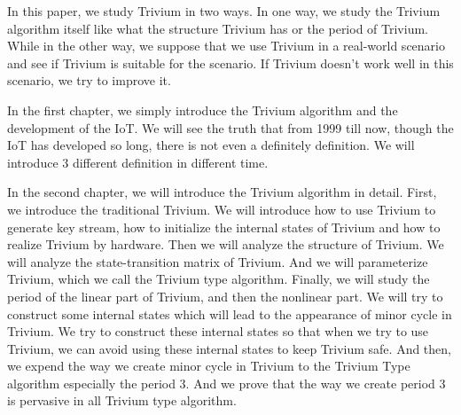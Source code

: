 \begin{bigabstract}
In this paper, we study Trivium in two ways. In one way, we study the Trivium algorithm itself like what the structure Trivium has or the period of Trivium. While in the other way, we suppose that we use Trivium in a real-world scenario and see if Trivium is suitable for the scenario. If Trivium doesn’t work well in this scenario, we try to improve it.

In the first chapter, we simply introduce the Trivium algorithm and the development of the IoT. We will see the truth that from 1999 till now, though the IoT has developed so long, there is not even a definitely definition. We will introduce 3 different definition in different time.

In the second chapter, we will introduce the Trivium algorithm in detail. First, we introduce the traditional Trivium. We will introduce how to use Trivium to generate key stream, how to initialize the internal states of Trivium and how to realize Trivium by hardware. Then we will analyze the structure of Trivium. We will analyze the state-transition matrix of Trivium. And we will parameterize Trivium, which we call the Trivium type algorithm. Finally, we will study the period of the linear part of Trivium, and then the nonlinear part. We will try to construct some internal states which will lead to the appearance of minor cycle in Trivium. We try to construct these internal states so that when we try to use Trivium, we can avoid using these internal states to keep Trivium safe. And then, we expend the way we create minor cycle in Trivium to the Trivium Type algorithm especially the period 3. And we prove that the way we create period 3 is pervasive in all Trivium type algorithm.


\end{bigabstract}
